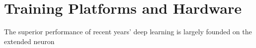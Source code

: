 \section{Training Platforms and Hardware}
The superior performance of recent years' deep learning is largely founded on the extended neuron